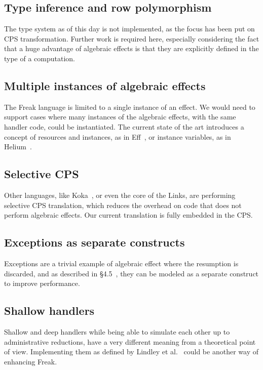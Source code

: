 \documentclass[declaration,shortabstract]{iithesis}
\theoremstyle{definition} \newtheorem{definition}{Definition}[chapter]
\theoremstyle{remark} \newtheorem{remark}[definition]{Observation}
\theoremstyle{plain} \newtheorem{theorem}[definition]{Theorem}
\theoremstyle{plain} \newtheorem{lemma}[definition]{Lemma}
\begin{document}
    \subsection{Type inference and row polymorphism}

    The type system as of this day is not implemented, as the focus has been put
    on CPS transformation. Further work is required here, especially considering
    the fact that a huge advantage of algebraic effects is that they are explicitly
    defined in the type of a computation.

    \subsection{Multiple instances of algebraic effects}

    The Freak language is limited to a single instance of an effect. We would
    need to support cases where many instances of the algebraic effects, with
    the same handler code, could be instantiated. The current state of the
    art introduces a concept of resources and instances, as in Eff~\cite{programming-in-eff},
    or instance variables, as in Helium~\cite{binders-labels}.

    \subsection{Selective CPS}

    Other languages, like Koka~\cite{leijen-koka}, or even the core of the Links, are
    performing selective CPS translation, which reduces the overhead on code
    that does not perform algebraic effects. Our current translation is fully
    embedded in the CPS.\@

    \subsection{Exceptions as separate constructs}

    Exceptions are a trivial example of algebraic effect where the resumption is
    discarded, and as described in \S 4.5~\cite{handlers-cps}, they can be modeled
    as a separate construct to improve performance.

    \subsection{Shallow handlers}

    Shallow and deep handlers while being able to simulate each other up to
    administrative reductions, have a very different meaning from a theoretical point
    of view. Implementing them as defined by Lindley et al.~\cite{shallow-handlers}
    could be another way of enhancing Freak.



\printbibliography{}
\end{document}
